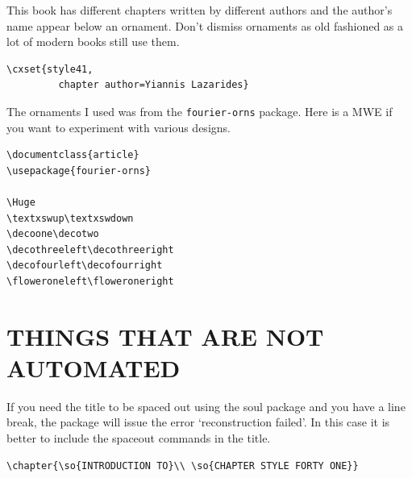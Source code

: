 \begin{figure}[ht]
\centering
{}
\end{figure}

This book has different chapters written by different authors and the author's name appear below an ornament. Don't dismiss ornaments as old fashioned as a lot of modern books still use them.

\begin{lstlisting}
\cxset{style41,
         chapter author=Yiannis Lazarides}
\end{lstlisting}

The ornaments I used was from the \texttt{fourier-orns} package. Here is a MWE if you want to experiment with various designs.


\begin{lstlisting}
\documentclass{article}
\usepackage{fourier-orns}

\Huge
\textxswup\textxswdown
\decoone\decotwo
\decothreeleft\decothreeright
\decofourleft\decofourright
\floweroneleft\floweroneright

\end{lstlisting}

\section{THINGS THAT ARE NOT AUTOMATED}

If you need the title to be spaced out using the soul package and you have a line break, the package will issue the error `reconstruction failed'. In this case it is better to include the spaceout commands in the title.


\begin{verbatim}
\chapter{\so{INTRODUCTION TO}\\ \so{CHAPTER STYLE FORTY ONE}}
\end{verbatim}

